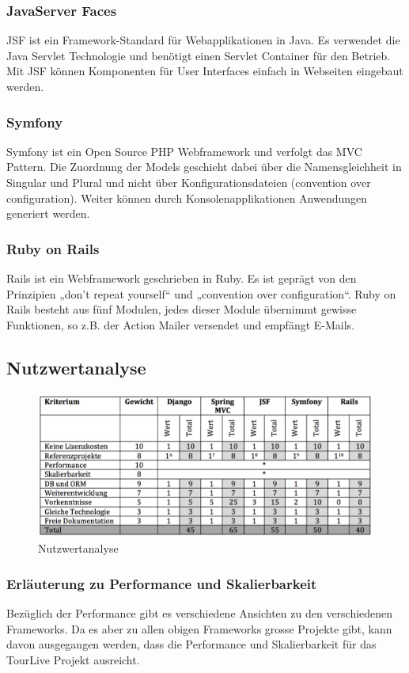 \subsubsection{JavaServer Faces}
JSF ist ein Framework-Standard für Webapplikationen in Java. Es verwendet die Java Servlet Technologie und benötigt einen Servlet Container für den Betrieb. Mit JSF können Komponenten für User Interfaces einfach in Webseiten eingebaut werden. 
\subsubsection{Symfony}
Symfony ist ein Open Source PHP Webframework und verfolgt das MVC Pattern. Die Zuordnung der Models geschieht dabei über die Namensgleichheit in Singular und Plural und nicht über Konfigurationsdateien (convention over configuration). Weiter können durch Konsolenapplikationen Anwendungen generiert werden.
\subsubsection{Ruby on Rails}
Rails ist ein Webframework geschrieben in Ruby. Es ist geprägt von den Prinzipien „don’t repeat yourself“ und „convention over configuration“. Ruby on Rails besteht aus fünf Modulen, jedes dieser Module übernimmt gewisse Funktionen, so z.B. der Action Mailer versendet und empfängt E-Mails.
\subsection{Nutzwertanalyse}
\begin{figure}[H]
	\includegraphics[width=130mm]{images/tourliveweb/nutzwertanalyse.png}
	\caption{Nutzwertanalyse}
\end{figure}
\subsubsection{Erläuterung zu Performance und Skalierbarkeit}
Bezüglich der Performance gibt es verschiedene Ansichten zu den verschiedenen Frameworks. Da es aber zu allen obigen Frameworks grosse Projekte gibt, kann davon ausgegangen werden, dass die Performance und Skalierbarkeit für das TourLive Projekt ausreicht.
